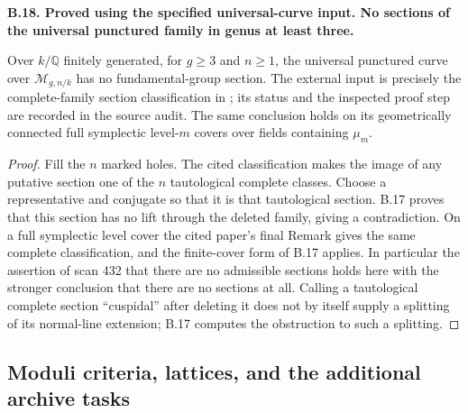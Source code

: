 \documentclass[11pt,oneside]{article}
\makeatletter
\newcounter{statementanchor}
\newenvironment{statement}[3]{%
 \refstepcounter{statementanchor}\def\@currentlabel{#1}%
 \par\addvspace{9pt}\noindent
 \textbf{#1. #2. #3.}\par\nobreak\noindent\ignorespaces
}{\par\addvspace{5pt}}
\makeatother
\begin{document}
\begin{statement}{B.18}{Proved using the specified universal-curve input}{No sections of the universal punctured family in genus at least three}
\label{st:B.18}

Over $k/\mathbb Q$ finitely generated, for $g\geq3$ and $n\geq1$,
the universal punctured curve over $\mathcal M_{g,n/k}$ has no
fundamental-group section.  The external input is precisely the
complete-family section classification in
\cite[Main theorem]{B_LuoWatanabe}; its status and the inspected
proof step are recorded in the source audit.  The same conclusion
holds on its geometrically connected full symplectic level-$m$
covers over fields containing $\mu_m$.
\end{statement}
\begin{proof}
Fill the $n$ marked holes.  The cited classification makes the image
of any putative section one of the $n$ tautological complete classes.
Choose a representative and conjugate so that it is that tautological
section.  B.17 proves that this section has no lift through the
deleted family, giving a contradiction.  On a full symplectic
level cover the cited paper's final Remark gives the same complete
classification, and the finite-cover form of B.17 applies.
In particular the assertion
of scan 432 that there are no admissible sections holds here with
the stronger conclusion that there are no sections at all.
Calling a tautological complete section ``cuspidal'' after deleting
it does not by itself supply a splitting of its normal-line
extension; B.17 computes the obstruction to such a splitting.
\end{proof}

\subsection{Moduli criteria, lattices, and the additional archive tasks}
\end{document}
